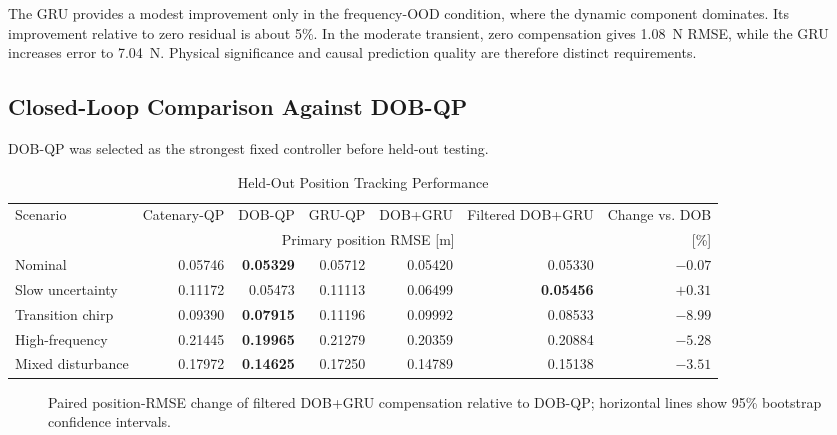 \documentclass[conference]{IEEEtran}
\begin{document}
The GRU provides a modest improvement only in the frequency-OOD condition, where the dynamic component dominates. Its improvement relative to zero residual is about 5\%. In the moderate transient, zero compensation gives \SI{1.08}{N} RMSE, while the GRU increases error to \SI{7.04}{N}. Physical significance and causal prediction quality are therefore distinct requirements.

\subsection{Closed-Loop Comparison Against DOB-QP}
DOB-QP was selected as the strongest fixed controller before held-out testing.

\begin{table}[t]
\caption{Held-Out Position Tracking Performance}
\centering\footnotesize
\begin{tabular}{lrrrrrr}
\toprule
Scenario & Catenary-QP & DOB-QP & GRU-QP & DOB+GRU & Filtered DOB+GRU & Change vs. DOB\\
 & \multicolumn{5}{c}{Primary position RMSE [m]} & [\%]\\
\midrule
Nominal & 0.05746 & \textbf{0.05329} & 0.05712 & 0.05420 & 0.05330 & $-0.07$\\
Slow uncertainty & 0.11172 & 0.05473 & 0.11113 & 0.06499 & \textbf{0.05456} & $+0.31$\\
Transition chirp & 0.09390 & \textbf{0.07915} & 0.11196 & 0.09992 & 0.08533 & $-8.99$\\
High-frequency & 0.21445 & \textbf{0.19965} & 0.21279 & 0.20359 & 0.20884 & $-5.28$\\
Mixed disturbance & 0.17972 & \textbf{0.14625} & 0.17250 & 0.14789 & 0.15138 & $-3.51$\\
\bottomrule
\end{tabular}
\end{table}

\begin{figure}[t]
\centering
{}
\caption{Paired position-RMSE change of filtered DOB+GRU compensation relative to DOB-QP; horizontal lines show 95\% bootstrap confidence intervals.}
\label{fig:control}
\end{figure}
\end{document}
